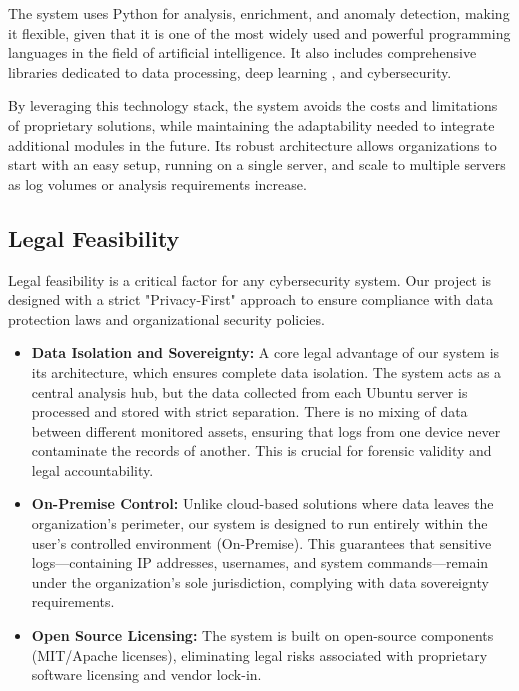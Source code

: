 \documentclass[12pt,a4paper]{report} %
\begin{document}
The system uses Python \cite{Python311} for analysis, enrichment, and anomaly detection, making it flexible, given that it is one of the most widely used and powerful programming languages in the field of artificial intelligence. It also includes comprehensive libraries dedicated to data processing, deep learning \cite{Hochreiter1997}, and cybersecurity.

By leveraging this technology stack, the system avoids the costs and limitations of proprietary solutions, while maintaining the adaptability needed to integrate additional modules in the future. Its robust architecture allows organizations to start with an easy setup, running on a single server, and scale to multiple servers as log volumes or analysis requirements increase.

\subsection{Legal Feasibility}
Legal feasibility is a critical factor for any cybersecurity system. Our project is designed with a strict "Privacy-First" approach to ensure compliance with data protection laws and organizational security policies.

\begin{itemize}
    \item \textbf{Data Isolation and Sovereignty:} A core legal advantage of our system is its architecture, which ensures complete data isolation. The system acts as a central analysis hub, but the data collected from each Ubuntu server is processed and stored with strict separation. There is no mixing of data between different monitored assets, ensuring that logs from one device never contaminate the records of another. This is crucial for forensic validity and legal accountability.
    
    \item \textbf{On-Premise Control:} Unlike cloud-based solutions where data leaves the organization's perimeter, our system is designed to run entirely within the user's controlled environment (On-Premise). This guarantees that sensitive logs—containing IP addresses, usernames, and system commands—remain under the organization's sole jurisdiction, complying with data sovereignty requirements.
    
    \item \textbf{Open Source Licensing:} The system is built on open-source components (MIT/Apache licenses), eliminating legal risks associated with proprietary software licensing and vendor lock-in.
\end{itemize}
\end{document}
